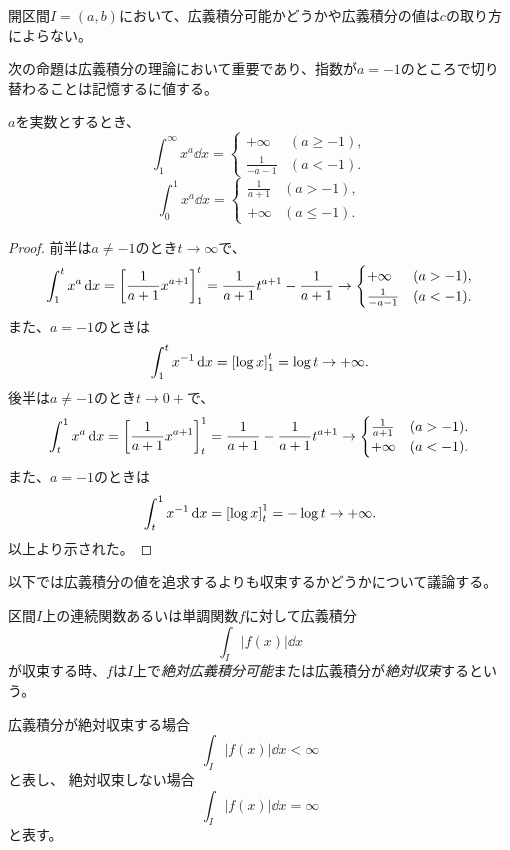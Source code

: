 \begin{remark}
開区間$I = (a, b)$において、広義積分可能かどうかや広義積分の値は$c$の取り方によらない。
\end{remark}

次の命題は広義積分の理論において重要であり、指数が$a = -1$のところで切り替わることは記憶するに値する。

\begin{proposition}
$a$を実数とするとき、
$$
\int_1^\infty x^a\dd{x} =
\begin{cases}
+\infty & (a \ge -1), \\
\frac{1}{-a-1} & (a < -1).
\end{cases}
$$
$$
\int_0^1 x^a\dd{x} =
\begin{cases}
\frac{1}{a+1} & (a > -1), \\
+\infty & (a \le -1).
\end{cases}
$$
\end{proposition}

\begin{proof}
前半は$a \ne -1$のとき$t \to \infty$で、
$$
\int_1^t x^a\dd{x} = \lreval*{\frac{1}{a+1}x^{a+1}}_1^t = \frac{1}{a+1}t^{a+1}-\frac{1}{a+1} \to
\begin{cases}
+\infty & (a > -1), \\
\frac{1}{-a-1} & (a < -1).
\end{cases}
$$
また、$a = -1$のときは
$$
\int_1^t x^{-1}\dd{x} = \lreval*{\log x}_1^t = \log t \to +\infty.
$$
後半は$a \ne -1$のとき$t \to 0+$で、
$$
\int_t^1 x^a\dd{x} = \lreval*{\frac{1}{a+1}x^{a+1}}_t^1 = \frac{1}{a+1}-\frac{1}{a+1}t^{a+1} \to
\begin{cases}
\frac{1}{a+1} & (a > -1). \\
+\infty & (a < -1).
\end{cases}
$$
また、$a = -1$のときは
$$
\int_t^1 x^{-1}\dd{x} = \lreval*{\log x}_t^1 = -\log t \to +\infty.
$$
以上より示された。
\end{proof}

以下では広義積分の値を追求するよりも収束するかどうかについて議論する。

\begin{definition}[広義積分の絶対収束]
区間$I$上の連続関数あるいは単調関数$f$に対して広義積分
$$
\int_I |f(x)|\dd{x}
$$
が収束する時、$f$は$I$上で\emph{絶対広義積分可能}または広義積分が\emph{絶対収束}するという。
\end{definition}

\begin{remark}
広義積分が絶対収束する場合
$$
\int_I |f(x)|\dd{x} < \infty
$$
と表し、
絶対収束しない場合
$$
\int_I |f(x)|\dd{x} = \infty
$$
と表す。
\end{remark}

